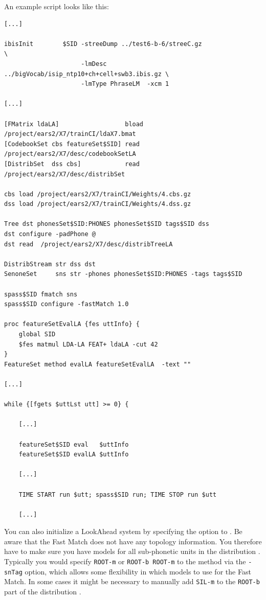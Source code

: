 An example script looks like this:

\begin{verbatim}
[...]

ibisInit        $SID -streeDump ../test6-b-6/streeC.gz                      \
                     -lmDesc    ../bigVocab/isip_ntp10+ch+cell+swb3.ibis.gz \
                     -lmType PhraseLM  -xcm 1

[...]

[FMatrix ldaLA]                  bload /project/ears2/X7/trainCI/ldaX7.bmat
[CodebookSet cbs featureSet$SID] read  /project/ears2/X7/desc/codebookSetLA
[DistribSet  dss cbs]            read  /project/ears2/X7/desc/distribSet

cbs load /project/ears2/X7/trainCI/Weights/4.cbs.gz
dss load /project/ears2/X7/trainCI/Weights/4.dss.gz

Tree dst phonesSet$SID:PHONES phonesSet$SID tags$SID dss
dst configure -padPhone @
dst read  /project/ears2/X7/desc/distribTreeLA

DistribStream str dss dst
SenoneSet     sns str -phones phonesSet$SID:PHONES -tags tags$SID

spass$SID fmatch sns
spass$SID configure -fastMatch 1.0

proc featureSetEvalLA {fes uttInfo} {
    global SID
    $fes matmul LDA-LA FEAT+ ldaLA -cut 42
}
FeatureSet method evalLA featureSetEvalLA  -text ""

[...]

while {[fgets $uttLst utt] >= 0} {

    [...]

    featureSet$SID eval   $uttInfo
    featureSet$SID evalLA $uttInfo

    [...]

    TIME START run $utt; spass$SID run; TIME STOP run $utt

    [...]
\end{verbatim}

You can   also   initialize a  LookAhead  system    by  specifying the
 option  to . Be aware
that  the Fast  Match does not   have  any topology information.   You
therefore have to make sure you have models for all sub-phonetic units
in the distribution \Jref{module}{Tree}.  Typically you would specify
\texttt{ROOT-m} or \texttt{ROOT-b  ROOT-m} to the \Jref{SPass}{fmatch}
method  via the \texttt{-snTag}  option, which allows some flexibility
in which models to use for the  Fast Match. In some  cases it might be
necessary to manually  add \texttt{SIL-m} to the  \texttt{ROOT-b} part
of the distribution \Jref{module}{Tree}.

